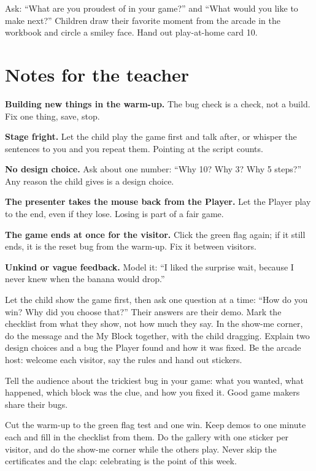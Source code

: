 \begin{reflection}
Ask: \enquote{What are you proudest of in your game?} and \enquote{What would you like to make next?} Children draw their favorite moment from the arcade in the workbook and circle a smiley face. Hand out play-at-home card 10.
\end{reflection}

\section{Notes for the teacher}
\begin{commonmistakes}
  \item \textbf{Building new things in the warm-up.} The bug check is a check, not a build. Fix one thing, save, stop.
  \item \textbf{Stage fright.} Let the child play the game first and talk after, or whisper the sentences to you and you repeat them. Pointing at the script counts.
  \item \textbf{No design choice.} Ask about one number: \enquote{Why 10? Why 3? Why 5 steps?} Any reason the child gives is a design choice.
  \item \textbf{The presenter takes the mouse back from the Player.} Let the Player play to the end, even if they lose. Losing is part of a fair game.
  \item \textbf{The game ends at once for the visitor.} Click the green flag again; if it still ends, it is the reset bug from the warm-up. Fix it between visitors.
  \item \textbf{Unkind or vague feedback.} Model it: \enquote{I liked the surprise wait, because I never knew when the banana would drop.}
\end{commonmistakes}

\begin{differentiation}
\supportpath Let the child show the game first, then ask one question at a time: \enquote{How do you win? Why did you choose that?} Their answers are their demo. Mark the checklist from what they show, not how much they say. In the show-me corner, do the message and the My Block together, with the child dragging.
\extensionpath Explain two design choices and a bug the Player found and how it was fixed. Be the arcade host: welcome each visitor, say the rules and hand out stickers.
\end{differentiation}

\begin{stretchchallenge}
Tell the audience about the trickiest bug in your game: what you wanted, what happened, which block was the clue, and how you fixed it. Good game makers share their bugs.
\end{stretchchallenge}

\begin{teachernote}
Cut the warm-up to the green flag test and one win. Keep demos to one minute each and fill in the checklist from them. Do the gallery with one sticker per visitor, and do the show-me corner while the others play. Never skip the certificates and the clap: celebrating is the point of this week.
\end{teachernote}
